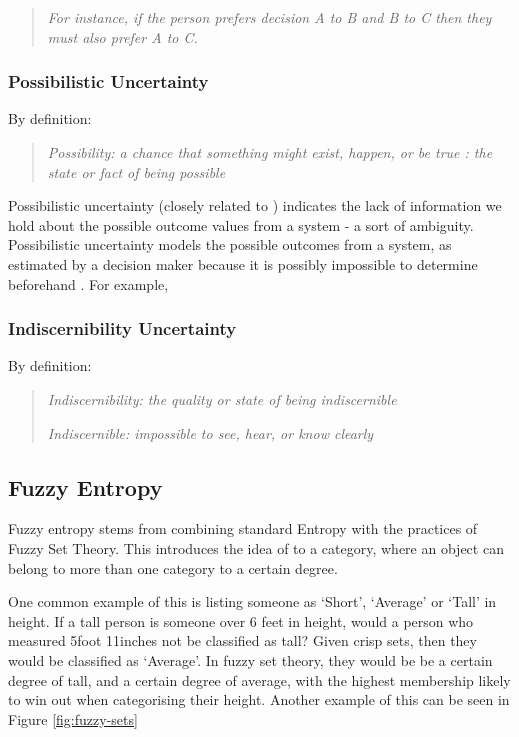 \begin{quotation}
  \textit{For instance, if the person prefers decision A to B and B to C then they must also prefer A to C.}
\end{quotation}

\subsubsection{Possibilistic Uncertainty}

By definition:

\begin{quotation}
  \textit{Possibility: a chance that something might exist, happen, or be true : the state or fact of being possible \cite{POSSIBILITY}}
\end{quotation}

Possibilistic uncertainty (closely related to ) indicates the lack of information we hold about the possible outcome values from a system - a sort of ambiguity. Possibilistic uncertainty models the possible outcomes from a system, as estimated by a decision maker because it is possibly impossible to determine beforehand \cite{Untiedt_2010}. For example,

\subsubsection{Indiscernibility Uncertainty}

By definition:

\begin{quotation}
  \textit{Indiscernibility: the quality or state of being indiscernible \cite{INDISCERNIBILITY}}

  \textit{Indiscernible: impossible to see, hear, or know clearly \cite{INDISCERNIBLE}}
\end{quotation}


\subsection{Fuzzy Entropy}

Fuzzy entropy stems from combining standard Entropy with the practices of Fuzzy Set Theory. This introduces the idea of  to a category, where an object can belong to more than one category to a certain degree.

One common example of this is listing someone as `Short', `Average' or `Tall' in height. If a tall person is someone over 6 feet in height, would a person who measured 5foot 11inches not be classified as tall? Given crisp sets, then they would be classified as `Average'. In fuzzy set theory, they would be be a certain degree of tall, and a certain degree of average, with the highest membership likely to win out when categorising their height. Another example of this can be seen in Figure \ref{fig:fuzzy-sets}

